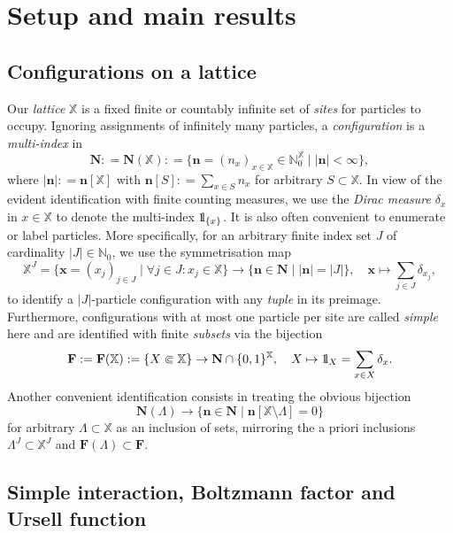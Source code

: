 \documentclass[reqno, 11pt]{amsart}
\theoremstyle{definition}
\newcommand{\N}{\mathbb{N}}
\newcommand{\X}{\mathbb X}
\def\1{{\mathchoice {1\mskip-4mu\mathrm l}      
{1\mskip-4mu\mathrm l}
{1\mskip-4.5mu\mathrm l} {1\mskip-5mu\mathrm l}}}
\begin{document}
\section{Setup and main results} \label{sec:results}

\subsection{Configurations on a lattice}

Our \emph{lattice} $\X$ is a fixed finite or countably infinite set of \emph{sites} for particles to occupy. 
Ignoring assignments of infinitely many particles, a \emph{configuration} is a \emph{multi-index} in
\[
	\mathbf N : = \mathbf N(\X) : = \{\mathbf n = (n_x)_{x \in \X} \in \N_0^\X \mid |\mathbf n| < \infty\},
\]
where $|\mathbf n| : = \mathbf n[\X]$ with $\mathbf n[S] : = \sum_{x \in S} n_x$ for arbitrary $S \subset \X$. 
In view of the evident identification with finite counting measures, we use the \emph{Dirac measure} $\delta_x$ in $x \in \X$ to denote the multi-index $\1_{\{x\}}$. 
It is also often convenient to enumerate or label particles. 
More specifically, for an arbitrary finite index set $J$ of cardinality $|J| \in \N_0$, we use the symmetrisation map
\[
	\X^J = \{\mathbf x = (x_j)_{j \in J} \mid \forall j \in J : x_j \in \X\} \to \{\mathbf n \in \mathbf N \mid |\mathbf n| = |J|\}, \quad \mathbf x \mapsto \sum_{j \in J} \delta_{x_j},
\]
to identify a $|J|$-particle configuration with any \emph{tuple} in its preimage. 
Furthermore, configurations with at most one particle per site are called \emph{simple} here and are identified with finite \emph{subsets} via the bijection
\[
	\mathbf F : = \mathbf F(\X) : = \{X \Subset \X\} \to \mathbf N \cap \{0,1\}^\X, \quad X \mapsto \1_X = \sum_{x \in X} \delta_x.
\]
Another convenient identification consists in treating the obvious bijection
\[
	\mathbf N(\Lambda) \to \{\mathbf n \in \mathbf N \mid \mathbf n[\X \setminus \Lambda] = 0\}
\]
for arbitrary $\Lambda \subset \X$ as an inclusion of sets, mirroring the a priori inclusions $\Lambda^J \subset \X^J$ and $\mathbf F(\Lambda) \subset \mathbf F$.

\subsection{Simple interaction, Boltzmann factor and Ursell function}
\end{document}
